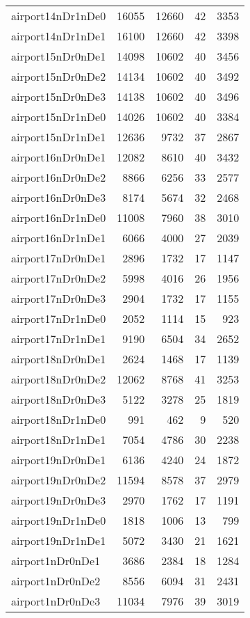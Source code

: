 \begin{tabular}{lrrrr}
airport14nDr1nDe0 & 16055 & 12660 & 42 & 3353 \\
airport14nDr1nDe1 & 16100 & 12660 & 42 & 3398 \\
airport15nDr0nDe1 & 14098 & 10602 & 40 & 3456 \\
airport15nDr0nDe2 & 14134 & 10602 & 40 & 3492 \\
airport15nDr0nDe3 & 14138 & 10602 & 40 & 3496 \\
airport15nDr1nDe0 & 14026 & 10602 & 40 & 3384 \\
airport15nDr1nDe1 & 12636 & 9732 & 37 & 2867 \\
airport16nDr0nDe1 & 12082 & 8610 & 40 & 3432 \\
airport16nDr0nDe2 & 8866 & 6256 & 33 & 2577 \\
airport16nDr0nDe3 & 8174 & 5674 & 32 & 2468 \\
airport16nDr1nDe0 & 11008 & 7960 & 38 & 3010 \\
airport16nDr1nDe1 & 6066 & 4000 & 27 & 2039 \\
airport17nDr0nDe1 & 2896 & 1732 & 17 & 1147 \\
airport17nDr0nDe2 & 5998 & 4016 & 26 & 1956 \\
airport17nDr0nDe3 & 2904 & 1732 & 17 & 1155 \\
airport17nDr1nDe0 & 2052 & 1114 & 15 & 923 \\
airport17nDr1nDe1 & 9190 & 6504 & 34 & 2652 \\
airport18nDr0nDe1 & 2624 & 1468 & 17 & 1139 \\
airport18nDr0nDe2 & 12062 & 8768 & 41 & 3253 \\
airport18nDr0nDe3 & 5122 & 3278 & 25 & 1819 \\
airport18nDr1nDe0 & 991 & 462 & 9 & 520 \\
airport18nDr1nDe1 & 7054 & 4786 & 30 & 2238 \\
airport19nDr0nDe1 & 6136 & 4240 & 24 & 1872 \\
airport19nDr0nDe2 & 11594 & 8578 & 37 & 2979 \\
airport19nDr0nDe3 & 2970 & 1762 & 17 & 1191 \\
airport19nDr1nDe0 & 1818 & 1006 & 13 & 799 \\
airport19nDr1nDe1 & 5072 & 3430 & 21 & 1621 \\
airport1nDr0nDe1 & 3686 & 2384 & 18 & 1284 \\
airport1nDr0nDe2 & 8556 & 6094 & 31 & 2431 \\
airport1nDr0nDe3 & 11034 & 7976 & 39 & 3019 \\

\end{tabular}
